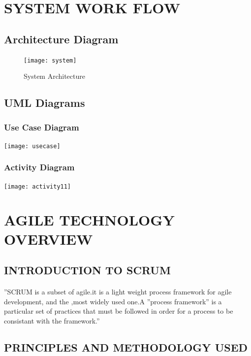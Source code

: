 \documentclass[a4paper, 12pt]{report}
\begin{document}
\section{SYSTEM WORK FLOW}
\subsection{Architecture Diagram}
\begin{figure}[hbtp]
\texttt{[image: system]}
\caption{System Architecture}
\end{figure}

\newpage
\subsection{UML Diagrams}
\subsubsection{Use Case Diagram}
\texttt{[image: usecase]}
\subsubsection{Activity Diagram}
\texttt{[image: activity11]}

\newpage
\section{AGILE TECHNOLOGY OVERVIEW}
\subsection{INTRODUCTION TO SCRUM}
\paragraph{}”SCRUM is a subset of agile.it is a light weight process framework for agile development, and the ,most widely used one.A ”process framework” is a particular set of practices that must be followed in order for a process to be consistant with the framework.”

\subsection{ PRINCIPLES AND METHODOLOGY USED}
\end{document}
